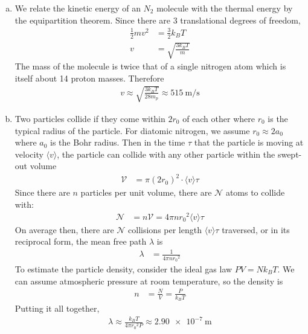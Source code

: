 \begin{enumerate}[(a)]
	\item
		We relate the kinetic energy of an $N_2$ molecule with the thermal
		energy by the equipartition theorem. Since there are 3 translational
		degrees of freedom,
		\begin{align*}
			\frac 12 mv^2 &= \frac 32 k_B T \\
			v &= \sqrt{\frac{3 k_B T}{m}}
		\end{align*}
		The mass of the molecule is twice that of a single nitrogen atom
		which is itself about 14 proton masses. Therefore
		\begin{align}
			\boxed{
			v \approx \sqrt{\frac{3 k_B T}{28 m_p}} \approx \SI{515}{\m\per\s}
			}
		\end{align}
	\item
		Two particles collide if they come within $2r_0$ of each other where
		$r_0$ is the typical radius of the particle. For diatomic nitrogen,
		we assume $r_0 \approx 2a_0$ where $a_0$ is the Bohr radius. Then in the time
		$\tau$ that the particle is moving at velocity $\langle v \rangle$, the particle can
		collide with any other particle within the swept-out volume
		\begin{align*}
			\mathcal V &= \pi(2r_0)^2\cdot \langle v \rangle\tau
		\end{align*}
		Since there are $n$ particles per unit volume, there are $\mathcal{N}$
		atoms to collide with:
		\begin{align*}
			\mathcal{N} &= n\mathcal{V} = 4\pi n{r_0}^2 \langle v \rangle\tau
		\end{align*}
		On average then, there are $\mathcal{N}$ collisions per length $\langle v \rangle\tau$
		traversed, or in its reciprocal form, the mean free path $\lambda$ is
		\begin{align*}
			\lambda &= \frac{1}{4\pi n{r_0}^2}
		\end{align*}
		To estimate the particle density, consider the ideal gas law
		$PV=Nk_BT$. We can assume atmospheric pressure at room temperature,
		so the density is
		\begin{align*}
			n &= \frac N V = \frac{P}{k_B T}
		\end{align*}
		Putting it all together,
		\begin{align}
			\boxed{
			\lambda \approx \frac{k_B T}{4\pi{r_0}^2P} \approx \SI{2.90e-7}{\m}
			}
		\end{align}
\end{enumerate}
